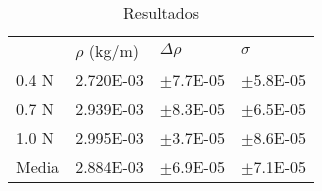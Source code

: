 \begin{table}
    \centering
    \caption{Resultados}
      \begin{tabular}{|l|r|r|r|}
      \hline
      \rowcolor[rgb]{ .788,  .788,  .788} \multicolumn{4}{|c|}{\textsc{RESULTADOS}} \bigstrut\\
      \hline
      \rowcolor[rgb]{ .929,  .929,  .929}       & \multicolumn{1}{l|}{$\rho$ (kg/m)} & \multicolumn{1}{l|}{$\Delta\rho$} & \multicolumn{1}{l|}{$\sigma$} \bigstrut\\
      \hline
      \rowcolor[rgb]{ .929,  .929,  .929} 0.4 N & \cellcolor[rgb]{ 1,  1,  1}2.720E-03 & \cellcolor[rgb]{ 1,  1,  1}$\pm$7.7E-05 & \cellcolor[rgb]{ 1,  1,  1}$\pm$5.8E-05 \bigstrut\\
      \hline
      \rowcolor[rgb]{ .929,  .929,  .929} 0.7 N & \cellcolor[rgb]{ 1,  1,  1}2.939E-03 & \cellcolor[rgb]{ 1,  1,  1}$\pm$8.3E-05 & \cellcolor[rgb]{ 1,  1,  1}$\pm$6.5E-05 \bigstrut\\
      \hline
      \rowcolor[rgb]{ .929,  .929,  .929} 1.0 N & \cellcolor[rgb]{ 1,  1,  1}2.995E-03 & \cellcolor[rgb]{ 1,  1,  1}$\pm$3.7E-05 & \cellcolor[rgb]{ 1,  1,  1}$\pm$8.6E-05 \bigstrut\\
      \hline
      \rowcolor[rgb]{ .929,  .929,  .929} Media & \cellcolor[rgb]{ 1,  1,  1}2.884E-03 & \cellcolor[rgb]{ 1,  1,  1}$\pm$6.9E-05 & \cellcolor[rgb]{ 1,  1,  1}$\pm$7.1E-05 \bigstrut\\
      \hline
      \end{tabular}%
    \label{tab:results}%
  \end{table}%